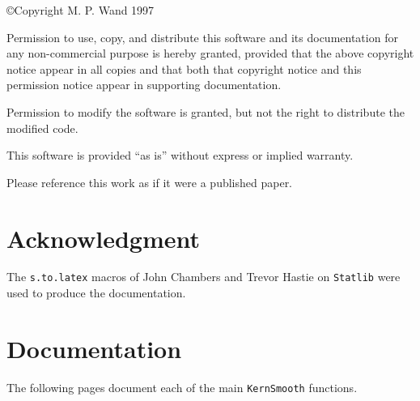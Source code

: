 \copyright Copyright M. P. Wand 1997     

\vskip3mm\noindent
Permission to use, copy, and distribute this software and its
documentation for any non-commercial purpose
is hereby granted, provided that the above copyright notice appear
in all copies and that both that copyright notice and this permission
notice appear in supporting documentation.

Permission to modify the software is granted, but not the right to
distribute the modified code.
  
This software is provided ``as is'' without express or implied warranty.

Please reference this work as if it were a published paper. 

\section*{\sc Acknowledgment}

The {\tt s.to.latex} macros of John Chambers
and Trevor Hastie on {\tt Statlib} were used to produce the documentation. 

\section*{\sc Documentation}

The following pages document each of the main 
{\tt KernSmooth} functions.

